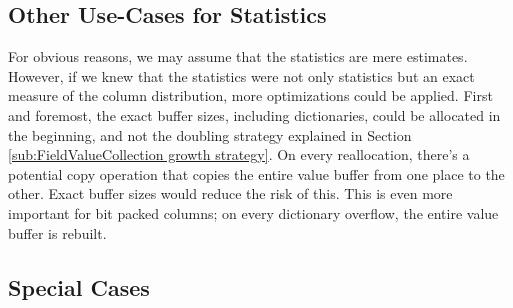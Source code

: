 \subsection{Other Use-Cases for Statistics}
\label{sub:Other Use-Cases for Statistics}
For obvious reasons, we may assume that the statistics are mere estimates. However, if we knew that the statistics were not only statistics but an exact measure of the column distribution, more optimizations could be applied. First and foremost, the exact buffer sizes, including dictionaries, could be allocated in the beginning, and not the doubling strategy explained in Section \ref{sub:FieldValueCollection growth strategy}. On every reallocation, there's a potential copy operation that copies the entire value buffer from one place to the other. Exact buffer sizes would reduce the risk of this. This is even more important for bit packed columns; on every dictionary overflow, the entire value buffer is rebuilt. 

\subsection{Special Cases}
\label{sub:Special Cases}

